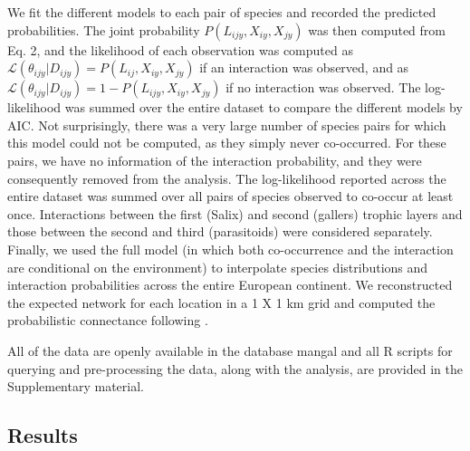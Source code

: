 \documentclass[12pt]{article}
\begin{document}
We fit the different models to each pair of species and recorded the
predicted probabilities. The joint probability $P(L_{ijy},X_{iy},X_{jy})$
was then computed from Eq. 2, and the likelihood of each observation was
computed as $\mathcal{L}(\theta_{ijy}|D_{ijy})=P(L_{ij},X_{iy},X_{jy})$ if an
interaction was observed, and as
$\mathcal{L}(\theta_{ijy}|D_{ijy})=1-P(L_{ijy},X_{iy},X_{jy})$ if no
interaction was observed. The log-likelihood was summed over the entire
dataset to compare the different models by AIC. Not surprisingly, there was a
very large number of species pairs for which this model could not be computed,
as they simply never co-occurred. For these pairs, we have no information of
the interaction probability, and they were consequently removed from the
analysis. The log-likelihood reported across the entire dataset was summed
over all pairs of species observed to co-occur at least once. Interactions
between the first (Salix) and second (gallers) trophic layers and those
between the second and third (parasitoids) were considered separately.
Finally, we used the full model (in which both co-occurrence and the
interaction are conditional on the environment) to interpolate species
distributions and interaction probabilities across the entire European
continent. We reconstructed the expected network for each location in a 1 X
1 km grid and computed the probabilistic connectance following
\citep{Poisot2015b}.

All of the data are openly available in the database mangal \citep{Poisot2015c} and
all R scripts for querying and pre-processing the data, along with the
analysis, are provided in the Supplementary material.

\subsection*{Results}
\end{document}
